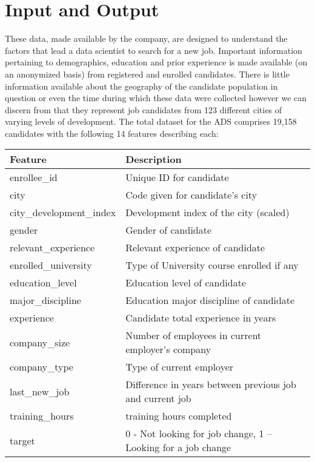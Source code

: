\pagebreak

\section{Input and Output}

These data, made available by the company, are designed to understand the factors that lead a data scientist to search for a new job.  Important information pertaining to demographics, education and prior experience is made available (on an anonymized basis) from registered and enrolled candidates.  There is little information available about the geography of the candidate population in question or even the time during which these data were collected however we can discern from that they represent job candidates from 123 different cities of varying levels of development.  The total dataset for the ADS comprises 19,158 candidates with the following 14 features describing each:


\begin{table}[h]
\centering
\begin{tabular}{ |p{4cm}||p{10cm}|  }
 
 \hline
 Feature 		& Description		\\
 \hline
enrollee\_id 	& Unique ID for candidate\\
city			& Code given for candidate's city \\
city\_development\_index & Development index of the city (scaled)\\
gender		& Gender of candidate\\
relevant\_experience & Relevant experience of candidate\\
enrolled\_university & Type of University course enrolled if any \\

education\_level & Education level of candidate\\

major\_discipline & Education major discipline of candidate \\

experience 	& Candidate total experience in years\\

company\_size 	& Number of employees in current employer's company \\

company\_type 	& Type of current employer\\

last\_new\_job 	& Difference in years between previous job and current job \\

training\_hours 	& training hours completed \\

target 		& 0 - Not looking for job change, 1 – Looking for a job change\\
 \hline
\end{tabular}
\end{table}



